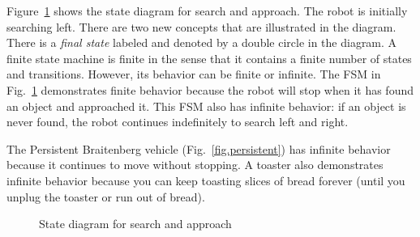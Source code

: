 Figure~\ref{fig.search-approach} shows the state diagram for search and approach. The robot is initially searching left. There are two new concepts that are illustrated in the diagram. There is a \emph{final state} labeled  and denoted by a double circle in the diagram. A finite state machine is finite in the sense that it contains a finite number of states and transitions. However, its behavior can be finite or infinite. The FSM in Fig.~\ref{fig.search-approach} demonstrates finite behavior because the robot will stop when it has found an object and approached it. This FSM also has infinite behavior: if an object is never found, the robot continues indefinitely to search left and right.

The Persistent Braitenberg vehicle (Fig.~\ref{fig.persistent}) has infinite behavior because it continues to move without stopping. A toaster also demonstrates infinite behavior because you can keep toasting slices of bread forever (until you unplug the toaster or run out of bread).

\begin{figure}
\begin{center}
\caption{State diagram for search and approach}\label{fig.search-approach}
\end{center}
\end{figure}


